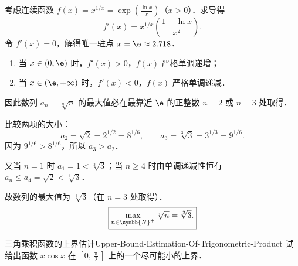 \begin{solution}
    考虑连续函数 $f(x) = x^{1/x} = \exp\left( \frac{\ln x}{x} \right)$（$x > 0$）．求导得
    \begin{equation}
        f'(x) = x^{1/x} \left( \frac{1 - \ln x}{x^2} \right).
    \end{equation}
    令 $f'(x) = 0$，解得唯一驻点 $x = \e \approx 2.718$．
    \begin{enumerate}
        \item 当 $x \in (0, \e)$ 时，$f'(x) > 0$，$f(x)$ 严格单调递增；
        \item 当 $x \in (\e, +\infty)$ 时，$f'(x) < 0$，$f(x)$ 严格单调递减．
    \end{enumerate}
    因此数列 $a_n = \sqrt[n]{n}$ 的最大值必在最靠近 $\e$ 的正整数 $n = 2$ 或 $n = 3$ 处取得．

    比较两项的大小：
    \begin{equation}
        a_2 = \sqrt{2} = 2^{1/2} = 8^{1/6}, \qquad a_3 = \sqrt[3]{3} = 3^{1/3} = 9^{1/6}.
    \end{equation}
    因为 $9^{1/6} > 8^{1/6}$，所以 $a_3 > a_2$．

    又当 $n = 1$ 时 $a_1 = 1 < \sqrt[3]{3}$；当 $n \geqslant 4$ 时由单调递减性恒有 $a_n \leqslant a_4 = \sqrt{2} < \sqrt[3]{3}$．

    故数列的最大值为 $\sqrt[3]{3}$（在 $n = 3$ 处取得）．
    \begin{equation}
        \boxed{\max_{n\in\symbb{N}^+} \sqrt[n]{n} = \sqrt[3]{3}.}
    \end{equation}
\end{solution}

\begin{problem}{三角乘积函数的上界估计}{Upper-Bound-Estimation-Of-Trigonometric-Product}
    试给出函数 $x \cos x$ 在 $\left[0, \frac{\uppi}{2}\right]$ 上的一个尽可能小的上界．
\end{problem}

